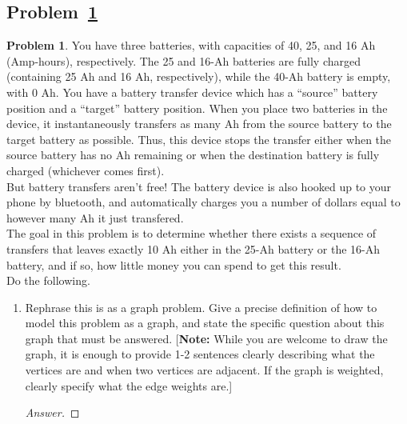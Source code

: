 \documentclass[11pt]{article}
\theoremstyle{definition}
\theoremstyle{definition}
\newtheorem{required}{Problem}
\theoremstyle{definition}
\begin{document}
\subsection{Problem~\ref{Dijkstra2}} 
\begin{required}\label{Dijkstra2}
You have three batteries, with capacities of 40, 25, and 16 Ah (Amp-hours), respectively. The 25 and 16-Ah batteries are fully charged (containing 25 Ah and 16 Ah, respectively), while the 40-Ah battery is empty, with 0 Ah. You have a battery transfer device which has a ``source'' battery position and a ``target'' battery position. When you place two batteries in the device, it instantaneously transfers as many Ah from the source battery to the target battery as possible. Thus, this device stops the transfer either when the source battery has no Ah remaining or when the destination battery is fully charged (whichever comes first).  \\

\noindent But battery transfers aren't free! The battery device is also hooked up to your phone by bluetooth, and automatically charges you a number of dollars equal to however many Ah it just transfered.  \\
	
\noindent The goal in this problem is to determine whether there exists a sequence of transfers that leaves exactly 10 Ah either in the 25-Ah battery or the 16-Ah battery, and if so, how little money you can spend to get this result. \\
\noindent Do the following.

\begin{enumerate}[label=(\alph*)]
\renewcommand{\thesubsubsection}{\thesubsection.\alph{subsubsection}}
	\subsubsection{Problem 2\ref{Dijkstra2a}}
	\item \label{Dijkstra2a} Rephrase this is as a graph problem. Give a precise definition of how to model this problem as a graph, and state the specific question about this graph that must be answered. [\textbf{Note:} While you are welcome to draw the graph, it is enough to provide 1-2 sentences clearly describing what the vertices are and when two vertices are adjacent. If the graph is weighted, clearly specify what the edge weights are.]
	
	\begin{proof}[Answer]
	\end{proof}


\end{enumerate}
\end{required}
\end{document}
